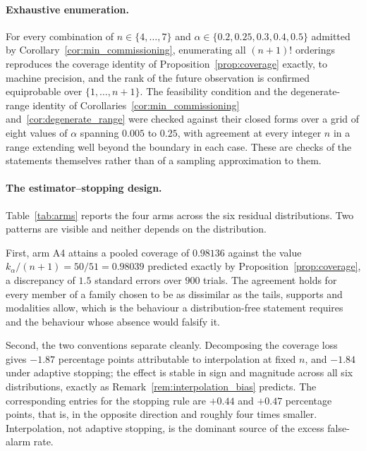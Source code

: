 \documentclass[a4paper]{cas-sc}
\begin{document}
\paragraph{Exhaustive enumeration.}
For every combination of \(n\in\{4,\ldots,7\}\) and
\(\alpha\in\{0.2,0.25,0.3,0.4,0.5\}\) admitted by
Corollary~\ref{cor:min_commissioning}, enumerating all \((n+1)!\) orderings
reproduces the coverage identity of Proposition~\ref{prop:coverage} exactly,
to machine precision, and the rank of the future observation is confirmed
equiprobable over \(\{1,\ldots,n+1\}\). The feasibility condition and the
degenerate-range identity of
Corollaries~\ref{cor:min_commissioning} and~\ref{cor:degenerate_range} were
checked against their closed forms over a grid of eight values of \(\alpha\)
spanning \(0.005\) to \(0.25\), with agreement at every integer \(n\) in a
range extending well beyond the boundary in each case. These are checks of the
statements themselves rather than of a sampling approximation to them.

\paragraph{The estimator--stopping design.}
Table~\ref{tab:arms} reports the four arms across the six residual
distributions. Two patterns are visible and neither depends on the
distribution.



First, arm A4 attains a pooled coverage of \(0.98136\) against the value
\(k_\alpha/(n+1)=50/51=0.98039\) predicted exactly by
Proposition~\ref{prop:coverage}, a discrepancy of \(1.5\) standard errors over
\(900\) trials. The agreement holds for every member of a family chosen to be
as dissimilar as the tails, supports and modalities allow, which is the
behaviour a distribution-free statement requires and the behaviour whose
absence would falsify it.

Second, the two conventions separate cleanly. Decomposing the coverage loss
gives \(-1.87\) percentage points attributable to interpolation at fixed
\(n\), and \(-1.84\) under adaptive stopping; the effect is stable in sign and
magnitude across all six distributions, exactly as
Remark~\ref{rem:interpolation_bias} predicts. The corresponding entries for
the stopping rule are \(+0.44\) and \(+0.47\) percentage points, that is, in
the opposite direction and roughly four times smaller. Interpolation, not
adaptive stopping, is the dominant source of the excess false-alarm rate.
\end{document}
